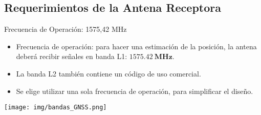 




\subsection{Requerimientos de la Antena Receptora}

\begin{frame}{Frecuencia de Operación: 1575,42 MHz}

\begin{itemize}
    \item<1-> Frecuencia de operación: para hacer una estimación de la posición, la antena deberá recibir señales en banda L1: $\mathbf{1575.42 \ MHz}$.
    \item<2-> La banda L2 también contiene un código de uso comercial.
    \item<3-> Se elige utilizar una sola frecuencia de operación, para simplificar el diseño.
\end{itemize}
\begin{center}
    \texttt{[image: img/bandas\_GNSS.png]}
\end{center}

\end{frame}

